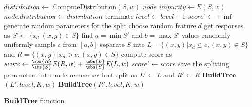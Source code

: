 \begin{algorithm}
 \SetAlgoLined
 $distribution \leftarrow$ ComputeDistribution$(S, w)$\;
 $node\_impurity \leftarrow E(S, w)$\;
 {
  $node.distribution \leftarrow distribution$\;
  terminate\;
 }
 $level \leftarrow level - 1$\;
 $score' \leftarrow +\inf$\;
 {
  generate random parameters for the split\;
  choose random feature $d$\;
  get responses as $S' \leftarrow \{x_d | (x, y) \in S\}$\;
  find $a = \min S'$ and $b = \max S'$ values\;
  randomly uniformly sample $c$ from $[a, b]$\;
  separate $S$ into $L = \{(x, y) | x_d \leq c, (x, y) \in S\}$ and $R = \{(x, y) | x_d > c, (x, y) \in S\}$\;
  compute score as $score \leftarrow \frac{\abs{R}}{\abs{S}}E(R, w) + \frac{\abs{L}}{\abs{S}}E(L, w)$\;
  {
    $score' \leftarrow score$\;
    save the splitting parameters into node\;
    remember best split as $L' \leftarrow L$ and $R' \leftarrow R$\;
  }
 }
 {
  \bf{BuildTree}$(L', level, K, w)$\;
 }
 {
  \bf{BuildTree}$(R', level, K, w)$\;
 }
 \caption{{\bf BuildTree} function}
 \label{alg:BuildTree}
\end{algorithm}